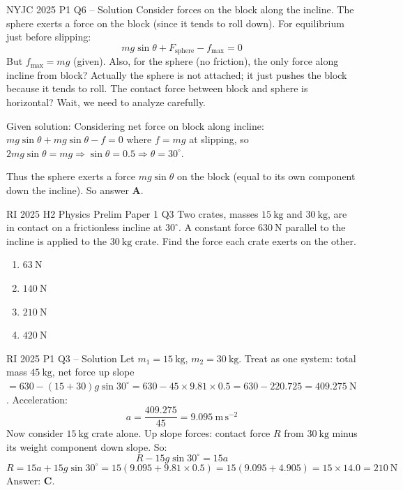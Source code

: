 \documentclass[11pt]{beamer}
\begin{document}
\begin{frame}{NYJC 2025 P1 Q6 – Solution}
Consider forces on the block along the incline. The sphere exerts a force on the block (since it tends to roll down). For equilibrium just before slipping:
\[ mg\sin\theta + F_{\text{sphere}} - f_{\text{max}} = 0 \]
But $f_{\text{max}} = mg$ (given). Also, for the sphere (no friction), the only force along incline from block? Actually the sphere is not attached; it just pushes the block because it tends to roll. The contact force between block and sphere is horizontal? Wait, we need to analyze carefully.

Given solution: Considering net force on block along incline: $mg\sin\theta + mg\sin\theta - f = 0$ where $f = mg$ at slipping, so $2mg\sin\theta = mg \Rightarrow \sin\theta = 0.5 \Rightarrow \theta = 30^\circ$.

Thus the sphere exerts a force $mg\sin\theta$ on the block (equal to its own component down the incline). So answer \textbf{A}.
\end{frame}

\begin{frame}[shrink=20]{RI 2025 H2 Physics Prelim Paper 1 Q3}
Two crates, masses $15\ \mathrm{kg}$ and $30\ \mathrm{kg}$, are in contact on a frictionless incline at $30^\circ$. A constant force $630\ \mathrm{N}$ parallel to the incline is applied to the $30\ \mathrm{kg}$ crate. Find the force each crate exerts on the other.
\begin{enumerate}[A]
    \item $63\ \mathrm{N}$
    \item $140\ \mathrm{N}$
    \item $210\ \mathrm{N}$
    \item $420\ \mathrm{N}$
\end{enumerate}
\end{frame}

\begin{frame}{RI 2025 P1 Q3 – Solution}
Let $m_1 = 15\ \mathrm{kg}$, $m_2 = 30\ \mathrm{kg}$. Treat as one system: total mass $45\ \mathrm{kg}$, net force up slope $= 630 - (15+30)g\sin30^\circ = 630 - 45\times9.81\times0.5 = 630 - 220.725 = 409.275\ \mathrm{N}$. Acceleration:
\[ a = \frac{409.275}{45} = 9.095\ \mathrm{m\,s^{-2}} \]
Now consider $15\ \mathrm{kg}$ crate alone. Up slope forces: contact force $R$ from $30\ \mathrm{kg}$ minus its weight component down slope. So:
\[ R - 15g\sin30^\circ = 15a \]
\[ R = 15a + 15g\sin30^\circ = 15(9.095 + 9.81\times0.5) = 15(9.095 + 4.905) = 15\times14.0 = 210\ \mathrm{N} \]
Answer: \textbf{C}.
\end{frame}
\end{document}
